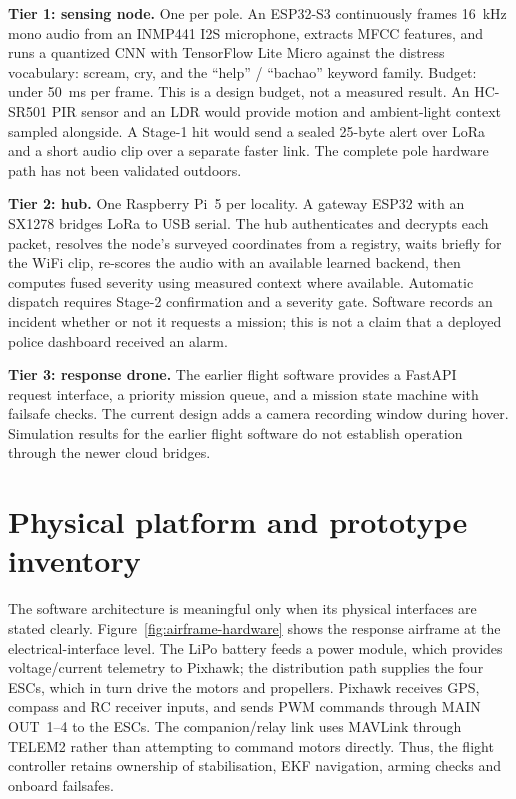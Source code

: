 \documentclass[12pt,a4paper]{report}
\begin{document}
\textbf{Tier 1: sensing node.} One per pole. An ESP32-S3
continuously frames 16~kHz mono audio from an INMP441 I2S microphone,
extracts MFCC features, and runs a quantized CNN with TensorFlow Lite
Micro against the distress vocabulary:
scream, cry, and the ``help'' / ``bachao'' keyword family. Budget:
under 50~ms per frame. This is a design budget, not a measured result.
An HC-SR501 PIR sensor and an LDR would provide
motion and ambient-light context sampled alongside. A Stage-1 hit
would send a sealed 25-byte alert over LoRa and a short audio clip
over a separate faster link. The complete pole hardware path has
not been validated outdoors.

\textbf{Tier 2: hub.} One Raspberry Pi~5 per locality. A gateway
ESP32 with an SX1278 bridges LoRa to USB serial. The hub authenticates
and decrypts each packet, resolves the node's surveyed coordinates
from a registry, waits briefly for the WiFi clip, re-scores the audio
with an available learned backend, then computes fused severity
using measured context where available. Automatic dispatch requires
Stage-2 confirmation and a severity gate. Software records an
incident whether or not it requests a mission; this is not a claim
that a deployed police dashboard received an alarm.

\textbf{Tier 3: response drone.} The earlier flight software provides
a FastAPI~\cite{fastapi} request interface, a priority mission queue,
and a mission state machine with failsafe checks. The current design
adds a camera recording window during hover. Simulation results for
the earlier flight software do not establish operation through the
newer cloud bridges.

\section{Physical platform and prototype inventory}
\label{sec:physical-platform}

The software architecture is meaningful only when its physical
interfaces are stated clearly. Figure~\ref{fig:airframe-hardware}
shows the response airframe at the electrical-interface level. The
LiPo battery feeds a power module, which provides voltage/current
telemetry to Pixhawk; the distribution path supplies the four ESCs,
which in turn drive the motors and propellers. Pixhawk receives GPS,
compass and RC receiver inputs, and sends PWM commands through MAIN
OUT~1--4 to the ESCs. The companion/relay link uses MAVLink through
TELEM2 rather than attempting to command motors directly. Thus, the
flight controller retains ownership of stabilisation, EKF navigation,
arming checks and onboard failsafes.
\end{document}
